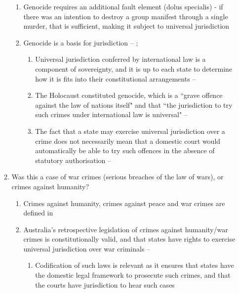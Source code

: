 \begin{enumerate}
\begin{enumerate}
\begin{enumerate}
            \item Genocide requires an additional fault element (dolus specialis) - if there was an intention to destroy a group manifest through a single murder, that is sufficient, making it subject to universal jurisdiction
            \item Genocide is a basis for jurisdiction -- ; 
            \begin{enumerate}
                \item Universal jurisdiction conferred by international law is a component of sovereignty, and it is up to each state to determine how it is fits into their constitutional arrangements -- 
                \item The Holocaust constituted genocide, which is a ``grave offence against the law of nations itself" and that ``the jurisdiction to try such crimes under international law is universal" -- 
                \item The fact that a state may exercise universal jurisdiction over a crime does not necessarily mean that a domestic court would automatically be able to try such offences in the absence of statutory authorisation -- 
            \end{enumerate}
        \end{enumerate}
        \item Was this a case of war crimes (serious breaches of the law of wars), or crimes against humanity?
        \begin{enumerate}
            \item Crimes against humanity, crimes against peace and war crimes are defined in 
            \item Australia's retrospective legislation of crimes against humanity/war crimes is constitutionally valid, and that states have rights to exercise universal jurisdiction over war criminals -- 
            \begin{enumerate}
                \item Codification of such laws is relevant as it ensures that states have the domestic legal framework to prosecute such crimes, and that the courts have jurisdiction to hear such cases

\end{enumerate}
\end{enumerate}
\end{enumerate}
\end{enumerate}

